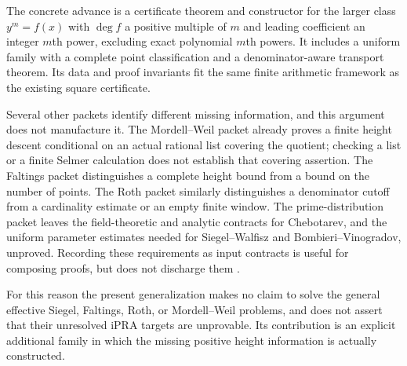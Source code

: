 The concrete advance is a certificate theorem and constructor for the
larger class $y^m=f(x)$ with $\deg f$ a positive multiple of $m$ and
leading coefficient an integer $m$th power, excluding exact polynomial
$m$th powers.  It includes a uniform family with a complete point
classification and a denominator-aware transport theorem.  Its data and
proof invariants fit the same finite arithmetic framework as the
existing square certificate.

Several other packets identify different missing information, and this
argument does not manufacture it.  The Mordell--Weil packet already
proves a finite height descent conditional on an actual rational list
covering the quotient; checking a list or a finite Selmer calculation
does not establish that covering assertion.  The Faltings packet
distinguishes a complete height bound from a bound on the number of
points.  The Roth packet similarly distinguishes a denominator cutoff
from a cardinality estimate or an empty finite window.  The
prime-distribution packet leaves the field-theoretic and analytic
contracts for Chebotarev, and the uniform parameter estimates needed
for Siegel--Walfisz and Bombieri--Vinogradov, unproved.  Recording these
requirements as input contracts is useful for composing proofs, but
does not discharge them \cite{repoMordell,repoFaltings,repoRoth,repoPrimes}.

For this reason the present generalization makes no claim to solve the
general effective Siegel, Faltings, Roth, or Mordell--Weil problems, and
does not assert that their unresolved iPRA targets are unprovable.  Its
contribution is an explicit additional family in which the missing
positive height information is actually constructed.
